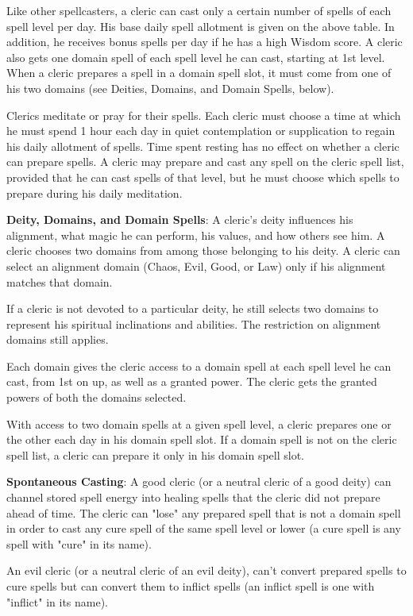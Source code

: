 Like other spellcasters, a cleric can cast only a certain number of spells of each spell level per day. His base daily spell allotment is given on the above table. In addition, he receives bonus spells per day if he has a high Wisdom score. A cleric also gets one domain spell of each spell level he can cast, starting at 1st level. When a cleric prepares a spell in a domain spell slot, it must come from one of his two domains (see Deities, Domains, and Domain Spells, below).

Clerics meditate or pray for their spells. Each cleric must choose a time at which he must spend 1 hour each day in quiet contemplation or supplication to regain his daily allotment of spells. Time spent resting has no effect on whether a cleric can prepare spells. A cleric may prepare and cast any spell on the cleric spell list, provided that he can cast spells of that level, but he must choose which spells to prepare during his daily meditation.

\textbf{Deity, Domains, and Domain Spells}: A cleric’s deity influences his alignment, what magic he can perform, his values, and how others see him. A cleric chooses two domains from among those belonging to his deity. A cleric can select an alignment domain (Chaos, Evil, Good, or Law) only if his alignment matches that domain.

If a cleric is not devoted to a particular deity, he still selects two domains to represent his spiritual inclinations and abilities. The restriction on alignment domains still applies.

Each domain gives the cleric access to a domain spell at each spell level he can cast, from 1st on up, as well as a granted power. The cleric gets the granted powers of both the domains selected.

With access to two domain spells at a given spell level, a cleric prepares one or the other each day in his domain spell slot. If a domain spell is not on the cleric spell list, a cleric can prepare it only in his domain spell slot.

\textbf{Spontaneous Casting}: A good cleric (or a neutral cleric of a good deity) can channel stored spell energy into healing spells that the cleric did not prepare ahead of time. The cleric can "lose" any prepared spell that is not a domain spell in order to cast any cure spell of the same spell level or lower (a cure spell is any spell with "cure" in its name).

An evil cleric (or a neutral cleric of an evil deity), can’t convert prepared spells to cure spells but can convert them to inflict spells (an inflict spell is one with "inflict" in its name).

